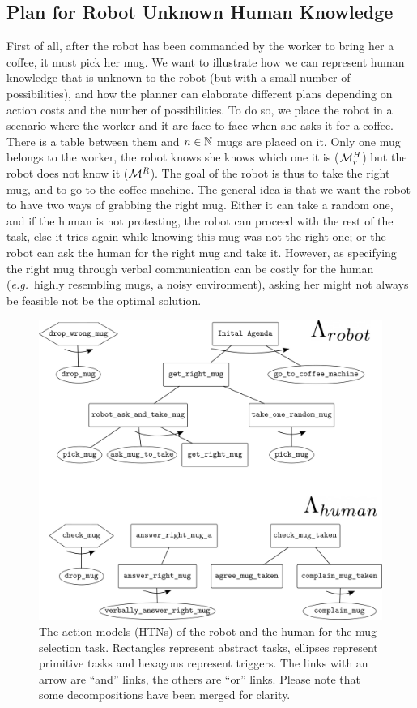 \documentclass[a4paper,11pt,twoside]{StyleThese}
\begin{document}
\subsection{Plan for Robot Unknown Human Knowledge}
First of all, after the robot has been commanded by the worker to bring her a coffee, it must pick her mug. We want to illustrate how we can represent human knowledge that is unknown to the robot (but with a small number of possibilities), and how the planner can elaborate different plans depending on action costs and the number of possibilities. To do so, we place the robot in a scenario where the worker and it are face to face when she asks it for a coffee. There is a table between them and $n \in \mathbb{N}$ mugs are placed on it. Only one mug belongs to the worker, the robot knows she knows which one it is ($\mathcal{M}^H_r$) but the robot does not know it ($\mathcal{M}^R$). The goal of the robot is thus to take the right mug, and to go to the coffee machine. The general idea is that we want the robot to have two ways of grabbing the right mug. Either it can take a random one, and if the human is not protesting, the robot can proceed with the rest of the task, else it tries again while knowing this mug was not the right one; or the robot can ask the human for the right mug and take it. However, as specifying the right mug through verbal communication can be costly for the human (\textit{e.g.}~highly resembling mugs, a noisy environment), asking her might not always be feasible not be the optimal solution.

\begin{figure}[hbtp]
\centering
\includegraphics[width=\textwidth]{figures/chapter4/HTN_hr_mugs.png}
\caption{The action models (HTNs) of the robot and the human for the mug selection task. Rectangles represent abstract tasks, ellipses represent primitive tasks and hexagons represent triggers. The links with an arrow are ``and'' links, the others are ``or'' links. Please note that some decompositions have been merged for clarity.}
\label{fig:chap4rhhtnmug}
\end{figure}
\end{document}
